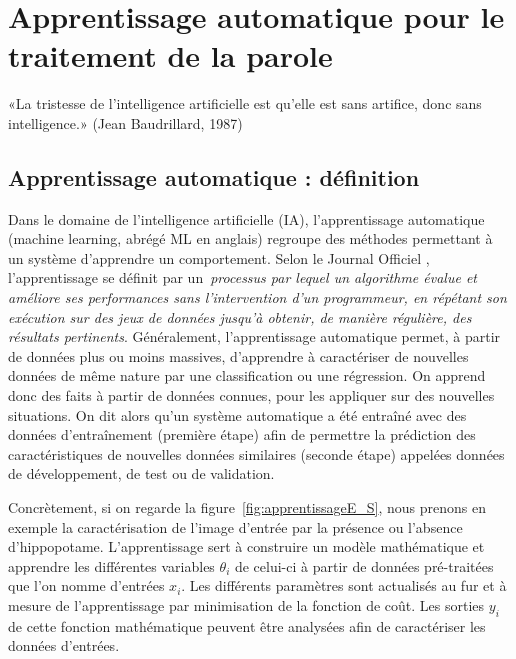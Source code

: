 \chapter{Apprentissage automatique pour le traitement de la parole}
\label{chapitre2}
«La tristesse de l'intelligence artificielle est qu'elle est sans artifice, donc sans intelligence.»  (Jean Baudrillard, 1987)

\section{Apprentissage automatique : définition}

Dans le domaine de l'intelligence artificielle (IA), l'apprentissage automatique (machine learning, abrégé ML en anglais) regroupe des méthodes permettant à un système d'apprendre un comportement. Selon le Journal Officiel %
, l'apprentissage se définit par un~\textit{processus par lequel un algorithme évalue et améliore ses performances sans l'intervention d'un programmeur, en répétant son exécution sur des jeux de données jusqu'à obtenir, de manière régulière, des résultats pertinents}. Généralement, l'apprentissage automatique permet, à partir de données plus ou moins massives, d'apprendre à caractériser de nouvelles données de même nature par une classification ou une régression. On apprend donc des faits à partir de données connues, pour les appliquer sur des nouvelles situations. On dit alors qu'un système automatique a été entraîné avec des données d’entraînement (première étape) afin de permettre la prédiction des caractéristiques de nouvelles données similaires (seconde étape) appelées données de développement, de test ou de validation.



Concrètement, si on regarde la figure~\ref{fig:apprentissageE_S}, nous prenons en exemple la caractérisation de l'image d'entrée par la présence ou l'absence d'hippopotame. L'apprentissage sert à construire un modèle mathématique et apprendre les différentes variables $\theta_i$ de celui-ci à partir de données pré-traitées que l'on nomme d'entrées $x_i$. Les différents paramètres sont actualisés au fur et à mesure de l'apprentissage par minimisation de la fonction de coût. Les sorties $y_i$ de cette fonction mathématique peuvent être analysées afin de caractériser les données d'entrées.

